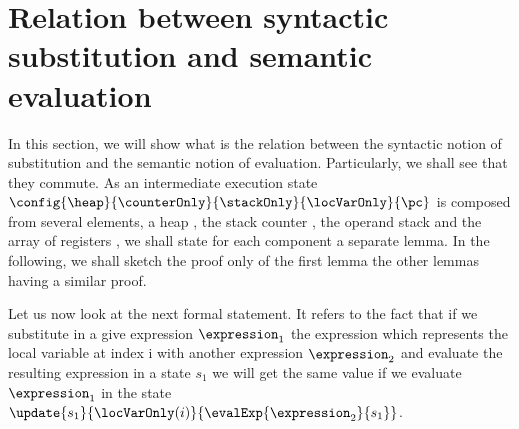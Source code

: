 \newtheorem{substHeap}{Lemma}[section]
\newtheorem{newHeap}[substHeap]{Lemma}
\newtheorem{substStack}[substHeap]{Lemma}
\newtheorem{substCntr}[substHeap]{Lemma}
\newtheorem{substLv}[substHeap]{Lemma}
\newtheorem{substRet}[substHeap]{Lemma}


\newtheorem{valid}{Definition}[section]

\section{Relation between syntactic substitution and semantic evaluation}\label{substProp}

In this section, we will show what is the relation between the syntactic notion
of substitution and the semantic notion of evaluation. Particularly, we shall see that they commute.
As an intermediate execution state $ \config{\heap}{\counterOnly}{ \stackOnly }{\locVarOnly}{\pc } $ 
is composed from several elements, a heap \heap{}, the stack counter \counterOnly, the operand stack \stackOnly{} 
and the array of registers \locVarOnly, we shall state for each component a separate lemma.
In the following, we shall sketch the proof only of the first lemma the other lemmas having a similar proof. 

Let us now look at the next formal statement.
It refers to the fact that if we substitute in a give expression $\expression_1$ 
the expression   which represents the local variable at index i
 with another expression $\expression_2$ and evaluate the resulting expression in a state $s_1$
 we will get the same value if we evaluate   $\expression_1$  in the state 
$\update{s_1}{\locVarOnly(i) }{ \evalExp{ \expression_2 }{s_1}  }$.


